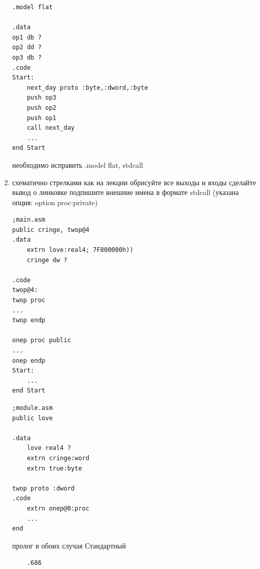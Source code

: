 \documentclass[a4paper,10pt]{article}
\begin{document}
\begin{enumerate}
\begin{verbatim}
.model flat

.data 
op1 db ?
op2 dd ?
op3 db ?
.code
Start:
    next_day proto :byte,:dword,:byte
    push op3
    push op2
    push op1
    call next_day
    ...
end Start
\end{verbatim}
необходимо исправить .model flat, stdcall
\newpage
    \item схематично стрелками как на лекции обрисуйте все выходы и входы сделайте вывод о линковке подпишите внешние имена в формате stdcall (указана опция: option proc:private)
\begin{multicols}{2}
\begin{verbatim}
;main.asm
public cringe, twop@4
.data
    extrn love:real4; 7F800000h))
    cringe dw ?
    
.code
twop@4:
twop proc
...
twop endp

onep proc public
...
onep endp
Start:
    ...
end Start
\end{verbatim}
\columnbreak
\begin{verbatim}
;module.asm
public love

.data
    love real4 ?
    extrn cringe:word
    extrn true:byte
    
twop proto :dword
.code
    extrn onep@0:proc
    ...
end
\end{verbatim}
\end{multicols}
пролог в обоих случая Стандартный\par
\begin{verbatim}
    .686
    

\end{verbatim}
\end{enumerate}
\end{document}
